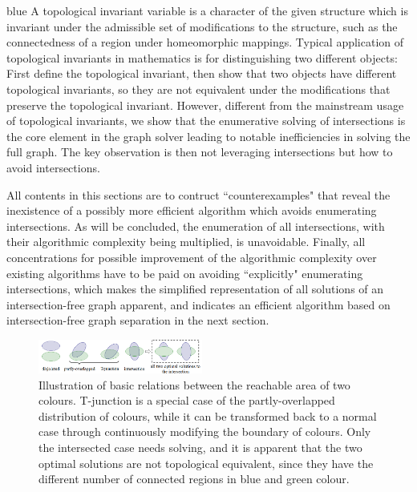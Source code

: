 \documentclass[journal]{IEEEtran}
\begin{document}
\begin{color}{blue}
A topological invariant variable is a character of the given structure which is invariant under the admissible set of modifications to the structure, such as the connectedness of a region under homeomorphic mappings. 
Typical application of topological invariants in mathematics is for distinguishing two different objects: First define the topological invariant, then show that two objects have different topological invariants, so they are not equivalent under the modifications that preserve the topological invariant. 
However, different from the mainstream usage of topological invariants, we show that the enumerative solving of intersections is the core element in the graph solver leading to notable inefficiencies in solving the full graph. 
The key observation is then not leveraging intersections but how to avoid intersections. 

All contents in this sections are to contruct ``counterexamples" that reveal the inexistence of a possibly more efficient algorithm which avoids enumerating intersections. 
As will be concluded, the enumeration of all intersections, with their algorithmic complexity being multiplied, is unavoidable. 
Finally, all concentrations for possible improvement of the algorithmic complexity over existing algorithms have to be paid on avoiding ``explicitly" enumerating intersections, which makes the simplified representation of all solutions of an intersection-free graph apparent, and indicates an efficient algorithm based on intersection-free graph separation in the next section. 

\begin{figure}[t]
\centering
\includegraphics[width = 0.48\textwidth]{figures/basic_shape_3}
\caption{Illustration of basic relations between the reachable area of two colours. T-junction is a special case of the partly-overlapped distribution of colours, while it can be transformed back to a normal case through continuously modifying the boundary of colours. Only the intersected case needs solving, and it is apparent that the two optimal solutions are not topological equivalent, since they have the different number of connected regions in blue and green colour. }\label{fig:basic_shape}
\end{figure}



\end{color}
\end{document}

